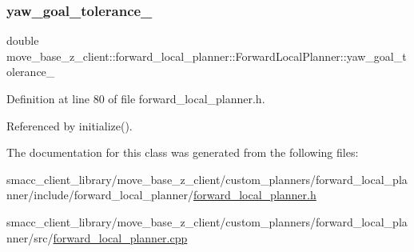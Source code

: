 \subsubsection{\texorpdfstring{yaw\+\_\+goal\+\_\+tolerance\+\_\+}{yaw\_goal\_tolerance\_}}
{\footnotesize\ttfamily double move\+\_\+base\+\_\+z\+\_\+client\+::forward\+\_\+local\+\_\+planner\+::\+Forward\+Local\+Planner\+::yaw\+\_\+goal\+\_\+tolerance\+\_\+\hspace{0.3cm}{\ttfamily [private]}}



Definition at line 80 of file forward\+\_\+local\+\_\+planner.\+h.



Referenced by initialize().



The documentation for this class was generated from the following files\+:\begin{DoxyCompactItemize}
\item 
smacc\+\_\+client\+\_\+library/move\+\_\+base\+\_\+z\+\_\+client/custom\+\_\+planners/forward\+\_\+local\+\_\+planner/include/forward\+\_\+local\+\_\+planner/\hyperlink{forward__local__planner_2include_2forward__local__planner_2forward__local__planner_8h}{forward\+\_\+local\+\_\+planner.\+h}\item 
smacc\+\_\+client\+\_\+library/move\+\_\+base\+\_\+z\+\_\+client/custom\+\_\+planners/forward\+\_\+local\+\_\+planner/src/\hyperlink{forward__local__planner_8cpp}{forward\+\_\+local\+\_\+planner.\+cpp}\end{DoxyCompactItemize}
